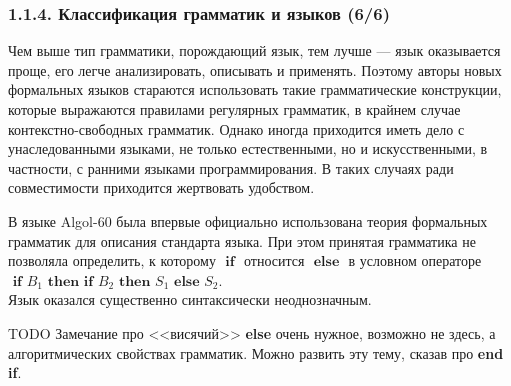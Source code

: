 \documentclass[mathserif,12pt,aspectratio=169]{beamer}
\def\TODO#1{{\color{gray} TODO {#1}}}
\begin{document}
\begin{frame}
\frametitle{1.1.4. Классификация грамматик и языков (6/6)}

\begin{digress}
Чем выше тип грамматики, 
порождающий язык, тем лучше ---
язык оказывается проще,
его легче анализировать,
описывать и применять.
Поэтому авторы новых
формальных языков стараются
использовать такие грамматические конструкции,
которые выражаются правилами
регулярных грамматик,
в крайнем случае контекстно-свободных грамматик.
Однако иногда приходится иметь дело
с унаследованными языками, 
не только естественными,
но и искусственными, в частности,
с ранними языками программирования.
В таких случаях ради совместимости
приходится жертвовать удобством.  
\end{digress}

\begin{example}
В языке Algol-60 была 
впервые официально использована теория 
формальных грамматик для описания стандарта языка.
При этом принятая  грамматика не позволяла 
определить, к которому $\textbf{ if }$ 
относится $\textbf{ else }$ 
в условном операторе \\ 
$\textbf{ if }
B_1 \textbf{ then if } B_2 \textbf{ then }
S_1 \textbf{ else } S_2$.\\ 
Язык оказался существенно 
синтаксически неоднозначным.
\end{example}

\TODO{Замечание про <<висячий>> \textbf{else} очень нужное, возможно не здесь, а алгоритмических свойствах грамматик. Можно развить эту тему, сказав про \textbf{end if}. }

\end{frame}
\end{document}
